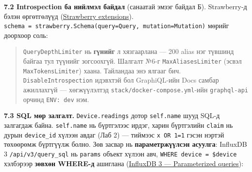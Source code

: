 \textbf{7.2 Introspection ба нийлмэл байдал} (санаатай эмзэг байдал Б). Strawberry-д бэлэн өргөтгөлүүд (\href{https://strawberry.rocks/docs/extensions/max-aliases-limiter}{Strawberry extensions}). \texttt{schema\ =\allowbreak{}\ strawberry.\allowbreak{}Schema(query=\allowbreak{}Query,\ mutation=\allowbreak{}Mutation)} мөрийг доорхоор соль:

\begin{Shaded}
\begin{Highlighting}[]

\OperatorTok{=}\NormalTok{ [QueryDepthLimiter(max\_depth}\OperatorTok{=}\NormalTok{),        }
\OperatorTok{=}\NormalTok{),  }
\OperatorTok{=}\NormalTok{)] }
\NormalTok{, }\NormalTok{) }\OperatorTok{==} \NormalTok{:}
\OperatorTok{=}\OperatorTok{=}\OperatorTok{=}\OperatorTok{=}
\end{Highlighting}
\end{Shaded}

\begin{quote}
\texttt{QueryDepthLimiter} нь \textbf{гүнийг} л хязгаарлана --- 200 alias нэг түвшинд байгаа тул түүнийг зогсоохгүй. Шалгалт №6-г \texttt{MaxAliasesLimiter} (эсвэл \texttt{MaxTokensLimiter}) хаана. Тайландаа энэ ялгааг бич. \texttt{DisableIntrospection} идэвхтэй бол GraphiQL-ийн Docs самбар ажиллахгүй --- хөгжүүлэлтэд \texttt{stack/\allowbreak{}docker-compose.\allowbreak{}yml}-ийн \texttt{graphql-api} орчинд \texttt{ENV:\ dev} нэм.
\end{quote}

\textbf{7.3 SQL мөр залгалт.} \texttt{Device.readings} дотор \texttt{self.name} шууд SQL-д залгагдаж байна. \texttt{self.name} нь бүртгэлээс ирдэг, харин бүртгэлийн \texttt{claim} нь дурын \texttt{device\_id} хүлээн авдаг (Лаб 2) --- тиймээс \texttt{x\textquotesingle{}\ OR\ \textquotesingle{}1\textquotesingle{}=\textquotesingle{}1} гэсэн нэртэй төхөөрөмж бүртгүүлж болно. Зөв засвар нь \textbf{параметржүүлсэн асуулга}: InfluxDB 3 \texttt{/\allowbreak{}api/\allowbreak{}v3/\allowbreak{}query\_\allowbreak{}sql} нь \texttt{params} объект хүлээн авч, \texttt{WHERE\ device\ =\allowbreak{}\ \$device} хэлбэрээр \textbf{зөвхөн WHERE-д} ашиглана (\href{https://docs.influxdata.com/influxdb3/core/query-data/sql/parameterized-queries/}{InfluxDB 3 --- Parameterized queries}):


